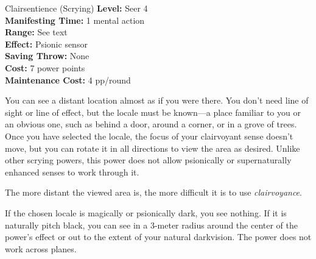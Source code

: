 {Clairsentience (Scrying)}
{
	\textbf{Level:}
	Seer 4\\
	\textbf{Manifesting Time:}
	1 mental action\\
	\textbf{Range:}
	See text\\
	\textbf{Effect:}
	Psionic sensor\\
	\textbf{Saving Throw:}
	None\\
	\textbf{Cost:}
	7 power points\\
	\textbf{Maintenance Cost:}
	4 pp/round\\
}
{
	You can see a distant location almost as if you were there. You don't need line of sight or line of effect, but the locale must be known---a place familiar to you or an obvious one, such as behind a door, around a corner, or in a grove of trees. Once you have selected the locale, the focus of your clairvoyant sense doesn't move, but you can rotate it in all directions to view the area as desired. Unlike other scrying powers, this power does not allow psionically or supernaturally enhanced senses to work through it.

	The more distant the viewed area is, the more difficult it is to use \emph{clairvoyance}.


	If the chosen locale is magically or psionically dark, you see nothing. If it is naturally pitch black, you can see in a 3-meter radius around the center of the power's effect or out to the extent of your natural darkvision. The power does not work across planes. 
}